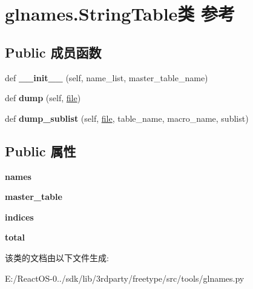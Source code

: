 \hypertarget{classglnames_1_1_string_table}{}\section{glnames.\+String\+Table类 参考}
\label{classglnames_1_1_string_table}
\subsection*{Public 成员函数}
\begin{DoxyCompactItemize}
\item 
\mbox{\label{classglnames_1_1_string_table_a3d12cdad664f68b01175a98b237387e1}} 
def {\bfseries \+\_\+\+\_\+init\+\_\+\+\_\+} (self, name\+\_\+list, master\+\_\+table\+\_\+name)
\item 
\mbox{\label{classglnames_1_1_string_table_af565dc409c7fddd0dcbec79898db3b13}} 
def {\bfseries dump} (self, \hyperlink{structfile}{file})
\item 
\mbox{\label{classglnames_1_1_string_table_a0209c5e4db76ef223a9fc5f3ec13c908}} 
def {\bfseries dump\+\_\+sublist} (self, \hyperlink{structfile}{file}, table\+\_\+name, macro\+\_\+name, sublist)
\end{DoxyCompactItemize}
\subsection*{Public 属性}
\begin{DoxyCompactItemize}
\item 
\mbox{\label{classglnames_1_1_string_table_a7693ce7c17ce6297ebc355255e486fba}} 
{\bfseries names}
\item 
\mbox{\label{classglnames_1_1_string_table_a3ed806622242d87a4836e95b077e36bb}} 
{\bfseries master\+\_\+table}
\item 
\mbox{\label{classglnames_1_1_string_table_a8c7ed89485464cd3fadd0e40e363e204}} 
{\bfseries indices}
\item 
\mbox{\label{classglnames_1_1_string_table_ae508f23e95d6a2350a765909a7885389}} 
{\bfseries total}
\end{DoxyCompactItemize}


该类的文档由以下文件生成\+:\begin{DoxyCompactItemize}
\item 
E\+:/\+React\+O\+S-\/0../sdk/lib/3rdparty/freetype/src/tools/glnames.\+py\end{DoxyCompactItemize}
